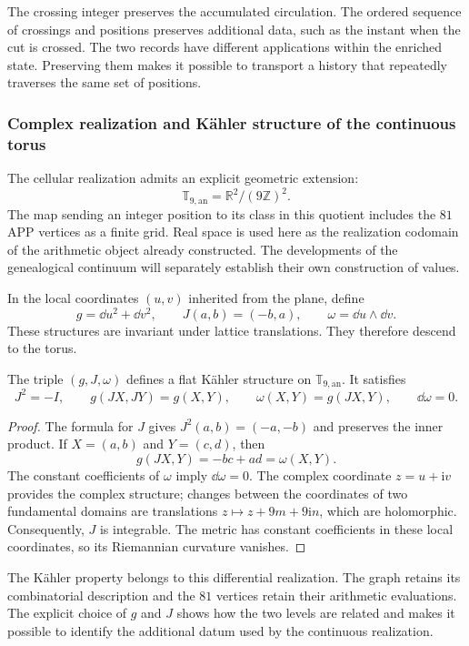 The crossing integer preserves the accumulated circulation. The ordered sequence of crossings and positions preserves additional data, such as the instant when the cut is crossed. The two records have different applications within the enriched state. Preserving them makes it possible to transport a history that repeatedly traverses the same set of positions.

\subsubsection{Complex realization and Kähler structure of the continuous torus}
\label{geo:kahler}

The cellular realization admits an explicit geometric extension:
\[
 \mathbb T_{9,\mathrm{an}}=\mathbb R^2/(9\mathbb Z)^2.
\]
The map sending an integer position to its class in this quotient includes the $81$ APP vertices as a finite grid. Real space is used here as the realization codomain of the arithmetic object already constructed. The developments of the genealogical continuum will separately establish their own construction of values.

In the local coordinates $(u,v)$ inherited from the plane, define
\[
 g=\dd u^2+\dd v^2,\qquad
 J(a,b)=(-b,a),\qquad
 \omega=\dd u\wedge\dd v.
\]
These structures are invariant under lattice translations. They therefore descend to the torus.

\begin{proposicion}
\label{geo:prop-kahler}
The triple $(g,J,\omega)$ defines a flat Kähler structure on $\mathbb T_{9,\mathrm{an}}$. It satisfies
\[
 J^2=-I,\qquad g(JX,JY)=g(X,Y),\qquad
 \omega(X,Y)=g(JX,Y),\qquad \dd\omega=0.
\]
\end{proposicion}

\begin{proof}
The formula for $J$ gives $J^2(a,b)=(-a,-b)$ and preserves the inner product. If $X=(a,b)$ and $Y=(c,d)$, then
\[
 g(JX,Y)=-bc+ad=\omega(X,Y).
\]
The constant coefficients of $\omega$ imply $\dd\omega=0$. The complex coordinate $z=u+\mathrm i v$ provides the complex structure; changes between the coordinates of two fundamental domains are translations $z\mapsto z+9m+9\mathrm i n$, which are holomorphic. Consequently, $J$ is integrable. The metric has constant coefficients in these local coordinates, so its Riemannian curvature vanishes.
\end{proof}

The Kähler property belongs to this differential realization. The graph retains its combinatorial description and the $81$ vertices retain their arithmetic evaluations. The explicit choice of $g$ and $J$ shows how the two levels are related and makes it possible to identify the additional datum used by the continuous realization.

